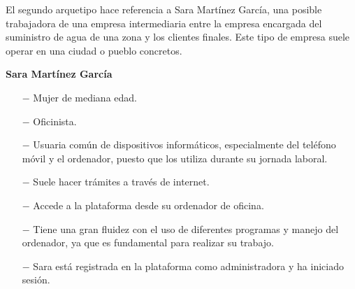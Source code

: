 \documentclass[pdftex,11pt,a4paper]{book}
\begin{document}
El segundo arquetipo hace referencia a Sara Martínez García, una posible trabajadora de una empresa intermediaria entre la empresa encargada del suministro de agua de una zona y los clientes finales. Este tipo de empresa suele operar en una ciudad o pueblo concretos.

\textbf{Sara Martínez García}
\vspace{-6mm}
\begin{itemize}
\addtolength{\itemsep}{-2mm}
\item [$-$] Mujer de mediana edad.
\item [$-$] Oficinista.
\item [$-$] Usuaria común de dispositivos informáticos, especialmente del teléfono móvil y el ordenador, puesto que los utiliza durante su jornada laboral.
\item [$-$] Suele hacer trámites a través de internet.
\item [$-$] Accede a la plataforma desde su ordenador de oficina.
\item [$-$] Tiene una gran fluidez con el uso de diferentes programas y manejo del ordenador, ya que es fundamental para realizar su trabajo.
\item [$-$] Sara está registrada en la plataforma como administradora y ha iniciado sesión.
\end{itemize}

\renewcommand{\tablename}{Tabla}
\renewcommand{\arraystretch}{1,7}
\end{document}
